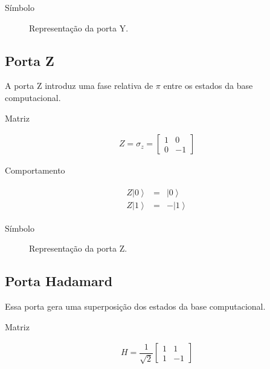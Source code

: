 Símbolo

\begin{figure}[!htp]
    \centering
    
    \caption{Representação da porta Y.}
    \label{fig:ygate}
\end{figure}


\subsection{Porta Z}\label{subsec:porta-z}

A porta Z introduz uma fase relativa de \(\pi\) entre os estados da base
computacional.

Matriz

\[\begin{aligned}
Z = \sigma_z =
\begin{bmatrix}
    1 & 0 \\
    0 & -1
\end{bmatrix}
\end{aligned}\]

Comportamento

\[\begin{aligned}
\begin{matrix}
    Z \left| 0 \right\rangle &=& \left| 0 \right\rangle \\
    Z \left| 1 \right\rangle &=& -\left| 1 \right\rangle
\end{matrix}
\end{aligned}\]

Símbolo

\begin{figure}[!htp]
    
    \caption{Representação da porta Z.}
    \label{fig:zgate}
\end{figure}

\subsection{Porta Hadamard}\label{subsec:porta-hadamard}

Essa porta gera uma superposição dos estados da base computacional.

Matriz

\[\begin{aligned}
H = \dfrac{1}{\sqrt{2}}
\begin{bmatrix}
    1 & 1 \\
    1 & -1
\end{bmatrix}
\end{aligned}\]

